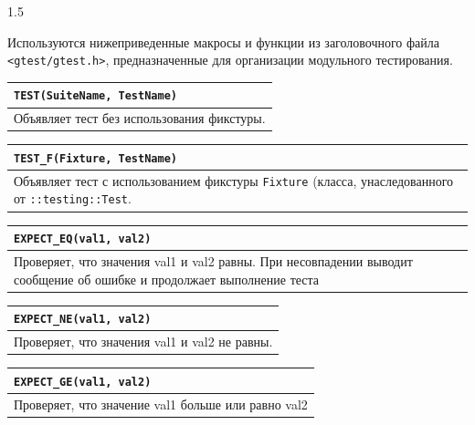 \documentclass[14pt,a4paper]{extarticle}
\begin{document}
\begin{spacing}{1.5}
\vspace{0.5cm}

\noindent Используются нижеприведенные макросы и функции из заголовочного файла \texttt{<gtest/gtest.h>}, предназначенные для организации модульного тестирования.

\vspace{0.2cm}

\noindent\begin{tabularx}{\textwidth}{|X|}
\hline
\texttt{TEST(SuiteName, TestName)} \\
\hline
Объявляет тест без использования фикстуры. \\
\hline
\end{tabularx}

\vspace{0.2cm}

\noindent\begin{tabularx}{\textwidth}{|X|}
\hline
\texttt{TEST\_F(Fixture, TestName)} \\
\hline
Объявляет тест с использованием фикстуры \texttt{Fixture} (класса, унаследованного от \texttt{::testing::Test}. \\
\hline
\end{tabularx}

\vspace{0.2cm}

\noindent\begin{tabularx}{\textwidth}{|X|}
\hline
\texttt{EXPECT\_EQ(val1, val2)} \\
\hline
Проверяет, что значения val1 и val2 равны. При несовпадении выводит сообщение об ошибке и продолжает выполнение теста \\
\hline
\end{tabularx}

\vspace{0.2cm}

\noindent\begin{tabularx}{\textwidth}{|X|}
\hline
\texttt{EXPECT\_NE(val1, val2)} \\
\hline
Проверяет, что значения val1 и val2 не равны. \\
\hline
\end{tabularx}

\vspace{0.2cm}

\noindent\begin{tabularx}{\textwidth}{|X|}
\hline
\texttt{EXPECT\_GE(val1, val2)} \\
\hline
Проверяет, что значение val1 больше или равно val2 \\
\hline
\end{tabularx}


\end{spacing}
\end{document}
